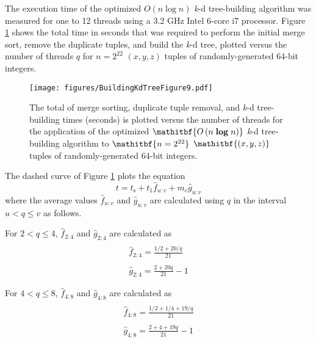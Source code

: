 \documentclass{sig-alternate}
\begin{document}
The execution time of the optimized $O\left(n \log n\right)$ \emph{k}-d tree-building algorithm was measured for one to 12 threads using a 3.2 GHz Intel 6-core i7 processor.  Figure \ref{fig:Optimized} shows the total time in seconds that was required to perform the initial merge sort, remove the duplicate tuples, and build the \emph{k}-d tree, plotted versus the number of threads $q$ for $n=2^{22}$ $\left(x,y,z \right)$ tuples of randomly-generated 64-bit integers.

\begin{figure}[h]
\centering
\centerline{\texttt{[image: figures/BuildingKdTreeFigure9.pdf]}}
\caption{The total of merge sorting, duplicate tuple removal, and \emph{k}-d tree-building times (seconds) is plotted versus the number of threads for the application of the optimized $\mathitbf{O\left(n \; \boldsymbol{\log} \; n\right)}$ \emph{k}-d tree-building algorithm to  $\mathitbf{n = 2^{22}}$ $\mathitbf{\left(x,y,z \right)}$ tuples of randomly-generated 64-bit integers.}
\label{fig:Optimized}
\end{figure}

\newpage

The dashed curve of Figure \ref{fig:Optimized} plots the equation
\begin{equation}
\label{eq:plot}
t =  t_\mathrm{s} + t_1 \hat{f}_{u:v} + m_\mathrm{c} \hat{g}_{u:v}
\end{equation}
where the average values $\hat{f}_{u:v}$ and $\hat{g}_{u:v}$ are calculated using $q$ in the interval $u < q \le v$ as follows.

For $2 < q \leq 4$, $\hat{f}_{2:4}$ and $\hat{g}_{2:4}$ are calculated as
\begin{equation}
\begin{matrix}
\\ \hat{f}_{2:4} = \frac{1/2 + 20 / q} {21}
\\
\\ \hat{g}_{2:4} =  \frac{2 + 20q} {21} - 1
\end{matrix}
\label{eq:plot4}
\end{equation}

For $4 < q \leq 8$, $\hat{f}_{4:8}$ and $\hat{g}_{4:8}$ are calculated as
\begin{equation}
\begin{matrix}
\\ \hat{f}_{4:8} = \frac{1/2 + 1/4 + 19 / q} {21}
\\
\\ \hat{g}_{4:8} =  \frac{2 + 4 + 19q} {21} - 1
\end{matrix}
\label{eq:plot8}
\end{equation}
\end{document}
